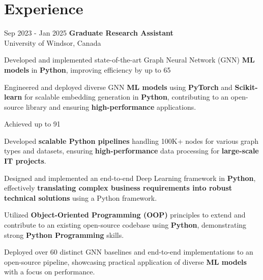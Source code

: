 \section{Experience}
        
        \begin{twocolentry}{
            Sep 2023 - Jan 2025
        }
            \textbf{Graduate Research Assistant} \\ University of Windsor, Canada\end{twocolentry}

        \vspace{0.10 cm}
        \begin{onecolentry}
            \begin{highlights}
                \item Developed and implemented state-of-the-art Graph Neural Network (GNN) \textbf{ML models} in \textbf{Python}, improving efficiency by up to 65\\%
                \item Engineered and deployed diverse GNN \textbf{ML models} using \textbf{PyTorch} and \textbf{Scikit-learn} for scalable embedding generation in \textbf{Python}, contributing to an open-source library and ensuring \textbf{high-performance} applications.
                \item Achieved up to 91\\%
                \item Developed \textbf{scalable Python pipelines} handling 100K+ nodes for various graph types and datasets, ensuring \textbf{high-performance} data processing for \textbf{large-scale IT projects}.
                \item Designed and implemented an end-to-end Deep Learning framework in \textbf{Python}, effectively \textbf{translating complex business requirements into robust technical solutions} using a Python framework.
                \item Utilized \textbf{Object-Oriented Programming (OOP)} principles to extend and contribute to an existing open-source codebase using \textbf{Python}, demonstrating strong \textbf{Python Programming} skills.
                \item Deployed over 60 distinct GNN baselines and end-to-end implementations to an open-source pipeline, showcasing practical application of diverse \textbf{ML models} with a focus on performance.

\end{highlights}
\end{onecolentry}
